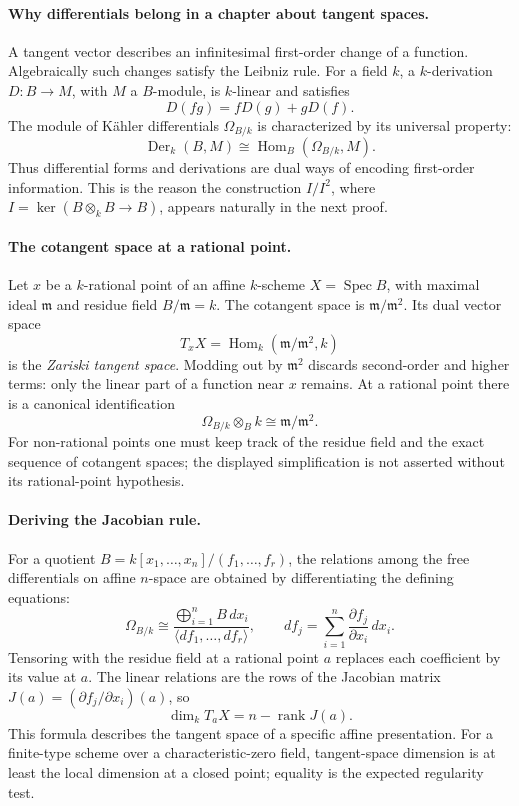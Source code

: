 \paragraph{Why differentials belong in a chapter about tangent spaces.}
A tangent vector describes an infinitesimal first-order change of
a function.  Algebraically such changes satisfy the Leibniz rule.
For a field \(k\), a \(k\)-derivation
\(D:B\to M\), with \(M\) a \(B\)-module, is \(k\)-linear
and satisfies
\[
 D(fg)=fD(g)+gD(f).
\]
The module of K\"ahler differentials \(\Omega_{B/k}\) is
characterized by its universal property:
\[
 \operatorname{Der}_k(B,M)
 \cong\operatorname{Hom}_B(\Omega_{B/k},M).
\]
Thus differential forms and derivations are dual ways of encoding
first-order information.  This is the reason the construction
\(I/I^2\), where \(I=\ker(B\otimes_k B\to B)\), appears naturally
in the next proof.

\paragraph{The cotangent space at a rational point.}
Let \(x\) be a \(k\)-rational point of an affine
\(k\)-scheme \(X=\operatorname{Spec}B\), with maximal ideal
\(\mathfrak m\) and residue field \(B/\mathfrak m=k\).
The cotangent space is \(\mathfrak m/\mathfrak m^2\).
Its dual vector space
\[
 T_xX=\operatorname{Hom}_k
 (\mathfrak m/\mathfrak m^2,k)
\]
is the \emph{Zariski tangent space}.  Modding out by
\(\mathfrak m^2\) discards second-order and higher terms:
only the linear part of a function near \(x\) remains.
At a rational point there is a canonical identification
\[
 \Omega_{B/k}\otimes_B k\cong\mathfrak m/\mathfrak m^2.
\]
For non-rational points one must keep track of the residue field
and the exact sequence of cotangent spaces; the displayed
simplification is not asserted without its rational-point hypothesis.

\paragraph{Deriving the Jacobian rule.}
For a quotient \(B=k[x_1,\ldots,x_n]/(f_1,\ldots,f_r)\),
the relations among the free differentials on affine \(n\)-space
are obtained by differentiating the defining equations:
\[
 \Omega_{B/k}\cong
 \frac{\bigoplus_{i=1}^n B\,dx_i}
 {\langle df_1,\ldots,df_r\rangle},
 \qquad
 df_j=\sum_{i=1}^{n}
 \frac{\partial f_j}{\partial x_i}\,dx_i.
\]
Tensoring with the residue field at a rational point \(a\)
replaces each coefficient by its value at \(a\).  The linear
relations are the rows of the Jacobian matrix
\(J(a)=(\partial f_j/\partial x_i)(a)\), so
\[
 \boxed{\dim_k T_aX=n-\operatorname{rank}J(a).}
\]
This formula describes the tangent space of a specific affine
presentation.  For a finite-type scheme over a characteristic-zero
field, tangent-space dimension is at least the local dimension at a
closed point; equality is the expected regularity test.

